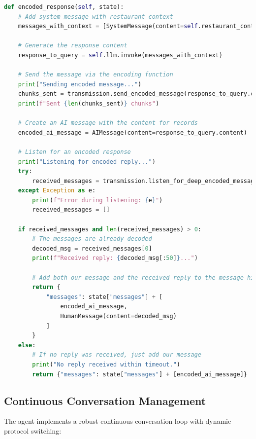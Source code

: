 \documentclass[12pt,openany]{article}
\theoremstyle{definition}
\theoremstyle{definition}
\theoremstyle{definition}
\begin{document}
\begin{lstlisting}[language=Python, caption=Latent Communication]
def encoded_response(self, state):
    # Add system message with restaurant context
    messages_with_context = [SystemMessage(content=self.restaurant_context)] + state["messages"]
    
    # Generate the response content
    response_to_query = self.llm.invoke(messages_with_context)
    
    # Send the message via the encoding function
    print("Sending encoded message...")
    chunks_sent = transmission.send_encoded_message(response_to_query.content, self.compressor)
    print(f"Sent {len(chunks_sent)} chunks")
    
    # Create an AI message with the content for records
    encoded_ai_message = AIMessage(content=response_to_query.content)
    
    # Listen for an encoded response
    print("Listening for encoded reply...")
    try:
        received_messages = transmission.listen_for_deep_encoded_messages(duration=60)
    except Exception as e:
        print(f"Error during listening: {e}")
        received_messages = []
    
    if received_messages and len(received_messages) > 0:
        # The messages are already decoded
        decoded_msg = received_messages[0]
        print(f"Received reply: {decoded_msg[:50]}...")
        
        # Add both our message and the received reply to the message history
        return {
            "messages": state["messages"] + [
                encoded_ai_message, 
                HumanMessage(content=decoded_msg)
            ]
        }
    else:
        # If no reply was received, just add our message
        print("No reply received within timeout.")
        return {"messages": state["messages"] + [encoded_ai_message]}
\end{lstlisting}

\subsection*{Continuous Conversation Management}
The agent implements a robust continuous conversation loop with dynamic protocol switching:
\end{document}
